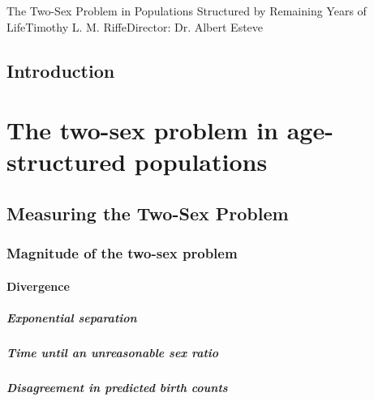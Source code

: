 \startabstractpage
{The Two-Sex Problem in Populations Structured by Remaining Years of
Life}{Timothy L. M. Riffe}{Director: Dr. Albert Esteve}

\label{Abstract}

\startthechapters 
 \chapter{Introduction}
 \label{chap:Intro}
 

\part*{The two-sex problem in age-structured populations}
  \chapter{Measuring the Two-Sex Problem}
    
    \section{Magnitude of the two-sex problem}
      
      \subsection{Divergence}
        
        \subsubsection{Exponential separation}
          
        \subsubsection{Time until an unreasonable sex ratio}
          
        \subsubsection{Disagreement in predicted birth counts}
          
